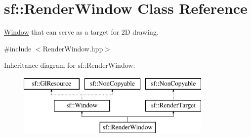 \hypertarget{classsf_1_1RenderWindow}{\section{sf\-:\-:Render\-Window Class Reference}
\label{classsf_1_1RenderWindow}
}


\hyperlink{classsf_1_1Window}{Window} that can serve as a target for 2\-D drawing.  




{\ttfamily \#include $<$Render\-Window.\-hpp$>$}

Inheritance diagram for sf\-:\-:Render\-Window\-:\begin{figure}[H]
\begin{center}
\leavevmode
\includegraphics[height=3.000000cm]{classsf_1_1RenderWindow}
\end{center}
\end{figure}
